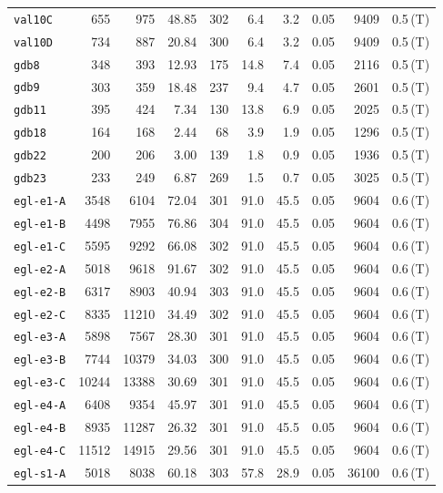 \begin{longtable}{lrrrrrrrrl}
\texttt{val10C} & 655 & 975 & 48.85 & 302 & 6.4 & 3.2 & 0.05 & 9409 & 0.5\,(T) \\
\texttt{val10D} & 734 & 887 & 20.84 & 300 & 6.4 & 3.2 & 0.05 & 9409 & 0.5\,(T) \\
\texttt{gdb8} & 348 & 393 & 12.93 & 175 & 14.8 & 7.4 & 0.05 & 2116 & 0.5\,(T) \\
\texttt{gdb9} & 303 & 359 & 18.48 & 237 & 9.4 & 4.7 & 0.05 & 2601 & 0.5\,(T) \\
\texttt{gdb11} & 395 & 424 & 7.34 & 130 & 13.8 & 6.9 & 0.05 & 2025 & 0.5\,(T) \\
\texttt{gdb18} & 164 & 168 & 2.44 & 68 & 3.9 & 1.9 & 0.05 & 1296 & 0.5\,(T) \\
\texttt{gdb22} & 200 & 206 & 3.00 & 139 & 1.8 & 0.9 & 0.05 & 1936 & 0.5\,(T) \\
\texttt{gdb23} & 233 & 249 & 6.87 & 269 & 1.5 & 0.7 & 0.05 & 3025 & 0.5\,(T) \\
\texttt{egl-e1-A} & 3548 & 6104 & 72.04 & 301 & 91.0 & 45.5 & 0.05 & 9604 & 0.6\,(T) \\
\texttt{egl-e1-B} & 4498 & 7955 & 76.86 & 304 & 91.0 & 45.5 & 0.05 & 9604 & 0.6\,(T) \\
\texttt{egl-e1-C} & 5595 & 9292 & 66.08 & 302 & 91.0 & 45.5 & 0.05 & 9604 & 0.6\,(T) \\
\texttt{egl-e2-A} & 5018 & 9618 & 91.67 & 302 & 91.0 & 45.5 & 0.05 & 9604 & 0.6\,(T) \\
\texttt{egl-e2-B} & 6317 & 8903 & 40.94 & 303 & 91.0 & 45.5 & 0.05 & 9604 & 0.6\,(T) \\
\texttt{egl-e2-C} & 8335 & 11210 & 34.49 & 302 & 91.0 & 45.5 & 0.05 & 9604 & 0.6\,(T) \\
\texttt{egl-e3-A} & 5898 & 7567 & 28.30 & 301 & 91.0 & 45.5 & 0.05 & 9604 & 0.6\,(T) \\
\texttt{egl-e3-B} & 7744 & 10379 & 34.03 & 300 & 91.0 & 45.5 & 0.05 & 9604 & 0.6\,(T) \\
\texttt{egl-e3-C} & 10244 & 13388 & 30.69 & 301 & 91.0 & 45.5 & 0.05 & 9604 & 0.6\,(T) \\
\texttt{egl-e4-A} & 6408 & 9354 & 45.97 & 301 & 91.0 & 45.5 & 0.05 & 9604 & 0.6\,(T) \\
\texttt{egl-e4-B} & 8935 & 11287 & 26.32 & 301 & 91.0 & 45.5 & 0.05 & 9604 & 0.6\,(T) \\
\texttt{egl-e4-C} & 11512 & 14915 & 29.56 & 301 & 91.0 & 45.5 & 0.05 & 9604 & 0.6\,(T) \\
\texttt{egl-s1-A} & 5018 & 8038 & 60.18 & 303 & 57.8 & 28.9 & 0.05 & 36100 & 0.6\,(T) \\

\end{longtable}
